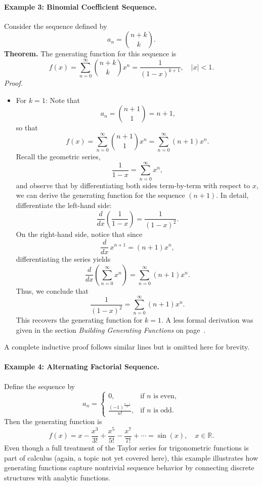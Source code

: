 \documentclass[docmute]{article}
\begin{document}
\paragraph{Example 3: Binomial Coefficient Sequence.}  
Consider the sequence defined by
\[
a_n=\binom{n+k}{k}.
\]
\textbf{Theorem.} The generating function for this sequence is
\[
f(x)=\sum_{n=0}^{\infty}\binom{n+k}{k}x^n=\frac{1}{(1-x)^{k+1}}, \quad |x|<1.
\]
\newpage
\textit{Proof.}  
\begin{itemize}
    \item For \(k=1\): Note that
    \[
    \ a_n = \binom{n+1}{1} = n+1,
    \]
    so that
    \[
    f(x) = \sum_{n=0}^{\infty} \binom{n+1}{1} x^n = \sum_{n=0}^{\infty} (n+1)x^n.
    \]
    Recall the geometric series,
    \[
    \frac{1}{1-x} = \sum_{n=0}^{\infty} x^n,
    \]
    and observe that by differentiating both sides term-by-term with respect to \(x\), we can derive the generating function for the sequence \((n+1)\). In detail, differentiate the left-hand side:
    \[
    \frac{d}{dx}\left(\frac{1}{1-x}\right) = \frac{1}{(1-x)^2}.
    \]
    On the right-hand side, notice that since
    \[
    \frac{d}{dx}\,x^{n+1} = (n+1)x^n,
    \]
    differentiating the series yields
    \[
    \frac{d}{dx}\left(\sum_{n=0}^{\infty} x^n\right) = \sum_{n=0}^{\infty} (n+1)x^n.
    \]
    Thus, we conclude that
    \[
    \frac{1}{(1-x)^2} = \sum_{n=0}^{\infty} (n+1)x^n.
    \]
    This recovers the generating function for \(k=1\). A less formal derivation was given in the section \emph{Building Generating Functions} on page~\pageref{sec:gf-building}.
\end{itemize}
A complete inductive proof follows similar lines but is omitted here for brevity.

\paragraph{Example 4: Alternating Factorial Sequence.}  
Define the sequence by
\[
a_n=
\begin{cases}
0, & \text{if } n \text{ is even},\\[1mm]
\displaystyle \frac{(-1)^{\frac{n-1}{2}}}{n!}, & \text{if } n \text{ is odd}.
\end{cases}
\]
Then the generating function is
\[
f(x)=x-\frac{x^3}{3!}+\frac{x^5}{5!}-\frac{x^7}{7!}+\cdots=\sin(x), \quad x\in\mathbb{R}.
\]
Even though a full treatment of the Taylor series for trigonometric functions is part of calculus (again, a topic not yet covered here), this example illustrates how generating functions capture nontrivial sequence behavior by connecting discrete structures with analytic functions.
\end{document}
